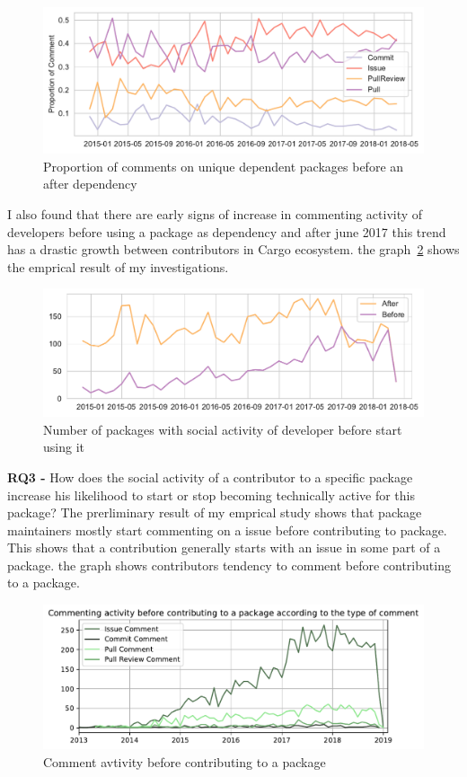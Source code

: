 \begin{figure}[htb]
    \includegraphics[width=\linewidth]{Photos/RQ22.pdf} 
    \caption{Proportion of comments on unique dependent packages before an after dependency}
    \label{fig:fig1}
\end{figure}


I also found that there are early signs of increase in commenting activity of developers before using a package as dependency and after june 2017 this trend has a drastic growth between contributors in Cargo ecosystem. the graph~\ref{fig:fig2} shows the emprical result of my investigations. 

\begin{figure}[thb]
    \includegraphics[width=\linewidth]{Photos/RQ21.pdf} 
    \caption{Number of packages with social activity of developer before start using it}
    \label{fig:fig2}
\end{figure}



\textbf{RQ3 - } How does the social activity of a contributor to a specific package increase his likelihood to start or stop becoming technically active for this package? The prerliminary result of my emprical study shows that package maintainers mostly start commenting on a issue before contributing to package. This shows that a contribution generally starts with an issue in some part of a package. the graph shows contributors tendency to comment before contributing to a package. 

\begin{figure}[thb]
    \includegraphics[width=\linewidth]{Photos/RQ3.pdf} 
    \caption{Comment avtivity before contributing to a package}
    \label{fig:fig3}
\end{figure}


